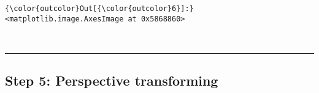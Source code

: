 \documentclass[11pt]{article}
\begin{document}
\begin{Verbatim}[commandchars=\\\{\}]
{\color{outcolor}Out[{\color{outcolor}6}]:} <matplotlib.image.AxesImage at 0x5868860>
\end{Verbatim}
            
    \begin{center}
    \end{center}
    { \hspace*{\fill} \\}
    
    \begin{center}\rule{0.5\linewidth}{\linethickness}\end{center}

\hypertarget{step-5-perspective-transforming}{%
\subsection{Step 5: Perspective
transforming}\label{step-5-perspective-transforming}}
\end{document}
